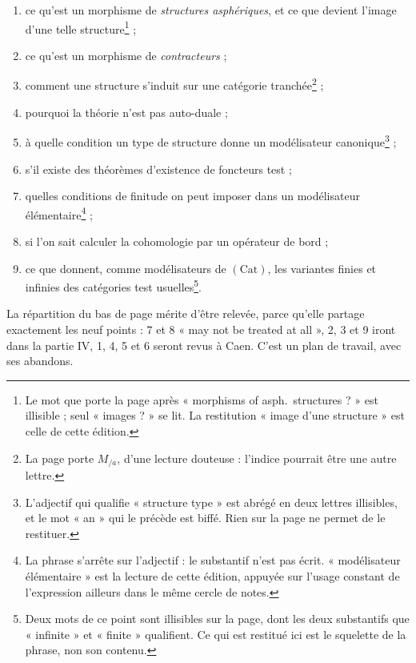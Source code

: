 \documentclass[11pt,a4paper]{article}
\begin{document}
\begin{enumerate}
\item ce qu'est un morphisme de \emph{structures asphériques}, et ce que
devient l'image d'une telle structure\footnote{Le mot que porte la page après
« morphisms of asph.\ structures ? » est illisible ; seul « images ? » se lit.
La restitution « image d'une structure » est celle de cette édition.} ;

\item ce qu'est un morphisme de \emph{contracteurs} ;

\item comment une structure s'induit sur une catégorie tranchée\footnote{La
page porte $M_{/a}$, d'une lecture douteuse : l'indice pourrait être une autre
lettre.} ;

\item pourquoi la théorie n'est pas auto-duale ;

\item à quelle condition un type de structure donne un modélisateur
canonique\footnote{L'adjectif qui qualifie « structure type » est abrégé en deux
lettres illisibles, et le mot « an » qui le précède est biffé. Rien sur la page
ne permet de le restituer.} ;

\item s'il existe des théorèmes d'existence de foncteurs test ;

\item quelles conditions de finitude on peut imposer dans un modélisateur
élémentaire\footnote{La phrase s'arrête sur l'adjectif : le substantif n'est pas
écrit. « modélisateur élémentaire » est la lecture de cette édition, appuyée sur
l'usage constant de l'expression ailleurs dans le même cercle de notes.} ;

\item si l'on sait calculer la cohomologie par un opérateur de bord ;

\item ce que donnent, comme modélisateurs de $(\mathrm{Cat})$, les variantes
finies et infinies des catégories test usuelles\footnote{Deux mots de ce point
sont illisibles sur la page, dont les deux substantifs que « infinite » et
« finite » qualifient. Ce qui est restitué ici est le squelette de la phrase, non
son contenu.}.
\end{enumerate}

La répartition du bas de page mérite d'être relevée, parce qu'elle partage
exactement les neuf points : 7 et 8 « may not be treated at all », 2, 3 et 9
iront dans la partie IV, 1, 4, 5 et 6 seront revus à Caen. C'est un plan de
travail, avec ses abandons.
\end{document}
